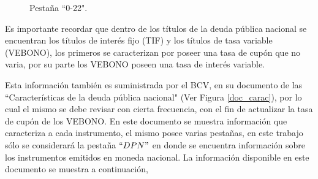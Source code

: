 \vspace{0.5cm}

\begin{figure}[h]
\caption{Pesta\~na ``0-22".}
\label{doc_bcv}
\end{figure}

\vspace{0.5cm}

\hspace{0.4cm} Es importante recordar que dentro de los t\'itulos de la deuda p\'ublica nacional se encuentran los t\'itulos de inter\'es fijo (TIF) y los t\'itulos de tasa variable (VEBONO), los primeros se caracterizan por poseer una tasa de cup\'on que no varia, por su parte los VEBONO poseen una tasa de inter\'es variable.

\vspace{0.5cm}

\hspace{0.4cm}Esta informaci\'on tambi\'en es suministrada por el BCV, en su documento de las ``Caracter\'isticas de la deuda p\'ublica nacional" (Ver Figura \ref{doc_carac}), por lo cual el mismo se debe revisar con cierta frecuencia, con el fin de actualizar la tasa de cup\'on de los VEBONO. En este documento se muestra informaci\'on que caracteriza a cada instrumento, el mismo posee varias pesta\~nas, en este trabajo s\'olo se considerar\'a la pesta\~na $``DPN"$ en donde se encuentra informaci\'on sobre los instrumentos emitidos en moneda nacional. La informaci\'on disponible en este documento se muestra a continuaci\'on,

